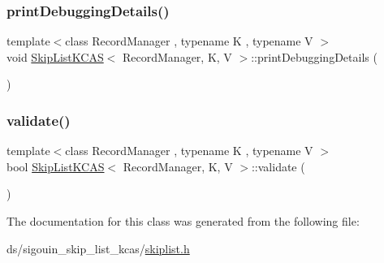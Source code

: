 \mbox{\label{classSkipListKCAS_a4863afabbb70b137e69bf3aef5f53481}} 
\subsubsection{\texorpdfstring{print\+Debugging\+Details()}{printDebuggingDetails()}}
{\footnotesize\ttfamily template$<$class Record\+Manager , typename K , typename V $>$ \\
void \hyperlink{classSkipListKCAS}{Skip\+List\+K\+C\+AS}$<$ Record\+Manager, K, V $>$\+::print\+Debugging\+Details (\begin{DoxyParamCaption}{ }\end{DoxyParamCaption})}

\mbox{\label{classSkipListKCAS_a50180c470d3c81053dc6cfd0ce942815}} 
\subsubsection{\texorpdfstring{validate()}{validate()}}
{\footnotesize\ttfamily template$<$class Record\+Manager , typename K , typename V $>$ \\
bool \hyperlink{classSkipListKCAS}{Skip\+List\+K\+C\+AS}$<$ Record\+Manager, K, V $>$\+::validate (\begin{DoxyParamCaption}{ }\end{DoxyParamCaption})}



The documentation for this class was generated from the following file\+:\begin{DoxyCompactItemize}
\item 
ds/sigouin\+\_\+skip\+\_\+list\+\_\+kcas/\hyperlink{skiplist_8h}{skiplist.\+h}\end{DoxyCompactItemize}

